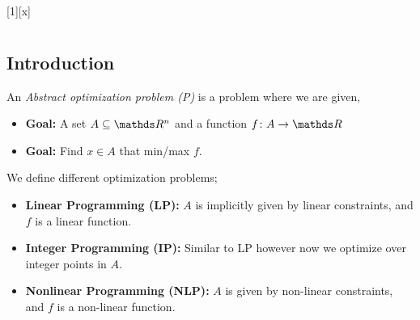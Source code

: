 \documentclass[12pt,oneside]{book} %
\begin{document}
	\renewcommand*{\term}{Term 2000} %
	\renewcommand*{\coursecode}{MATH 000} %
	\renewcommand*{\coursename}{Course Name} %
	\renewcommand*{\profname}{Prof Name} %
	\renewcommand*{\colink}{http://www.student.math.uwaterloo.ca/~c2kent} %
	\setfigpath
	\pagestyle{plain}
	\clearpage
	\pagestyle{chapterlecture}
	[x]
		\chapter{\chapname\chaplec}
		\section{Introduction}
		\begin{defn*}
			An \emph{Abstract optimization problem (P)} is a problem where we are given,
			\begin{itemize}
				\item \textbf{Goal: }A set $A\subseteq \R^n$ and a function $f \colon A \rightarrow \R$
				\item \textbf{Goal: }Find $x\in A$ that min/max $f$.
			\end{itemize}
		\end{defn*}
		\begin{defn*}
			We define different optimization problems;
			\begin{itemize}
				\item \textbf{Linear Programming (LP): } $A$ is implicitly given by linear constraints, and $f$ is a linear function.
				\item \textbf{Integer Programming (IP): } Similar to LP however now we optimize over integer points in $A$.
				\item \textbf{Nonlinear Programming (NLP): } $A$ is given by non-linear constraints, and $f$ is a non-linear function.
			\end{itemize}
		\end{defn*}
\end{document}
